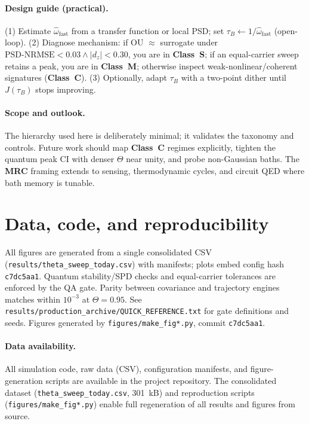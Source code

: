 \documentclass[11pt,letterpaper]{article}
\newcommand{\confighash}{c7dc5aa1}
\DeclareRobustCommand{\mrc}{\textbf{MRC}\xspace}
\DeclareRobustCommand{\classS}{\textbf{Class~S}\xspace}
\DeclareRobustCommand{\classC}{\textbf{Class~C}\xspace}
\DeclareRobustCommand{\classM}{\textbf{Class~M}\xspace}
\DeclareRobustCommand{\GatePSD}{\ensuremath{\text{PSD-NRMSE}<0.03}\xspace}
\DeclareRobustCommand{\GateDZ}{\ensuremath{\lvert d_z\rvert<0.30}\xspace}
\DeclareRobustCommand{\GateEQ}{\ensuremath{\GatePSD \wedge \GateDZ}\xspace}
\begin{document}
\paragraph*{Design guide (practical).}
(1) Estimate $\hat{\omega}_{\mathrm{fast}}$ from a transfer function or local PSD; set $\tau_B\leftarrow 1/\hat{\omega}_{\mathrm{fast}}$ (open-loop).
(2) Diagnose mechanism: if OU $\approx$ surrogate under \GateEQ, you are in \classS; if an equal-carrier sweep retains a peak, you are in \classM; otherwise inspect weak-nonlinear/coherent signatures (\classC).
(3) Optionally, adapt $\tau_B$ with a two-point dither until $J(\tau_B)$ stops improving.

\paragraph*{Scope and outlook.}
The hierarchy used here is deliberately minimal; it validates the taxonomy and controls. Future work should map \classC{} regimes explicitly, tighten the quantum peak CI with denser $\Theta$ near unity, and probe non-Gaussian baths. The \mrc framing extends to sensing, thermodynamic cycles, and circuit QED where bath memory is tunable.

\section*{Data, code, and reproducibility}
All figures are generated from a single consolidated CSV (\texttt{results/theta\_sweep\_today.csv}) with manifests; plots embed config hash \texttt{\confighash}. Quantum stability/SPD checks and equal-carrier tolerances are enforced by the QA gate. Parity between covariance and trajectory engines matches within $10^{-3}$ at $\Theta=0.95$. See \texttt{results/production\_archive/QUICK\_REFERENCE.txt} for gate definitions and seeds. Figures generated by \texttt{figures/make\_fig*.py}, commit \texttt{\confighash}.

\paragraph*{Data availability.} All simulation code, raw data (CSV), configuration manifests, and figure-generation scripts are available in the project repository. The consolidated dataset (\texttt{theta\_sweep\_\allowbreak today.csv}, 301~kB) and reproduction scripts (\texttt{figures/\allowbreak make\_fig*.py}) enable full regeneration of all results and figures from source.
\end{document}
